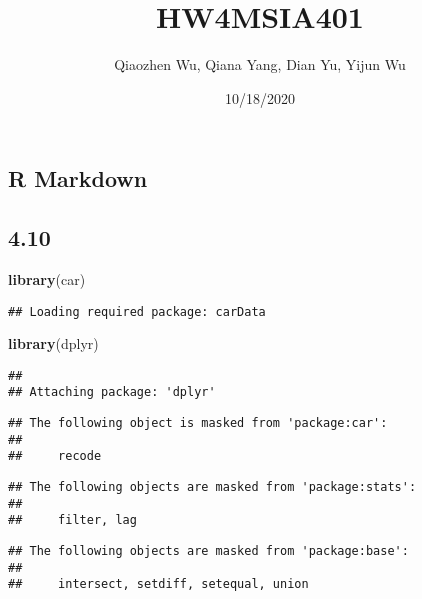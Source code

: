 \documentclass[
]{article}
\title{HW4MSIA401}
\author{Qiaozhen Wu, Qiana Yang, Dian Yu, Yijun Wu}
\date{10/18/2020}
\newenvironment{Shaded}{\begin{snugshade}}{\end{snugshade}}
\newcommand{\KeywordTok}[1]{\textcolor[rgb]{0.13,0.29,0.53}{\textbf{#1}}}
\newcommand{\NormalTok}[1]{#1}
\begin{document}
\maketitle

\hypertarget{r-markdown}{%
\subsection{R Markdown}\label{r-markdown}}

\hypertarget{section}{%
\subsection{4.10}\label{section}}

\begin{Shaded}
\begin{Highlighting}[]
\KeywordTok{library}\NormalTok{(car)}
\end{Highlighting}
\end{Shaded}

\begin{verbatim}
## Loading required package: carData
\end{verbatim}

\begin{Shaded}
\begin{Highlighting}[]
\KeywordTok{library}\NormalTok{(dplyr)}
\end{Highlighting}
\end{Shaded}

\begin{verbatim}
## 
## Attaching package: 'dplyr'
\end{verbatim}

\begin{verbatim}
## The following object is masked from 'package:car':
## 
##     recode
\end{verbatim}

\begin{verbatim}
## The following objects are masked from 'package:stats':
## 
##     filter, lag
\end{verbatim}

\begin{verbatim}
## The following objects are masked from 'package:base':
## 
##     intersect, setdiff, setequal, union
\end{verbatim}
\end{document}
